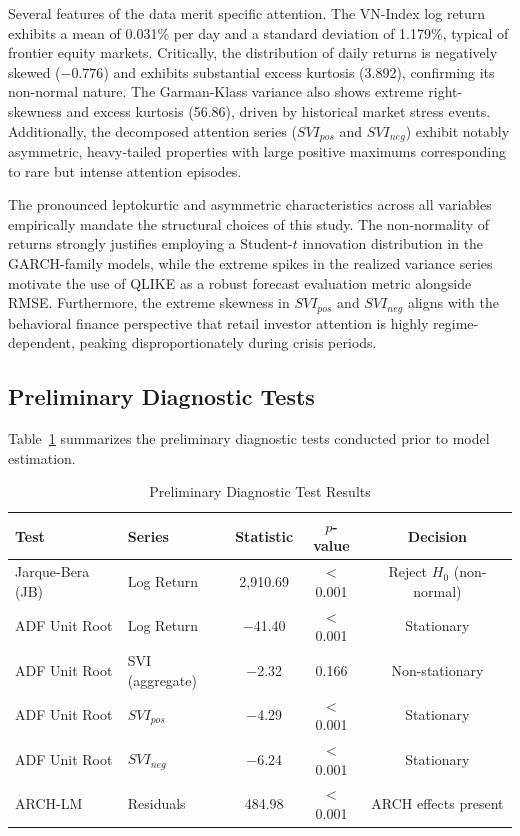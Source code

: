 \documentclass[12pt, a4paper]{article}
\begin{document}
Several features of the data merit specific attention. The VN-Index log return exhibits a mean of 0.031\% per day and a standard deviation of 1.179\%, typical of frontier equity markets. Critically, the distribution of daily returns is negatively skewed ($-0.776$) and exhibits substantial excess kurtosis (3.892), confirming its non-normal nature. The Garman-Klass variance also shows extreme right-skewness and excess kurtosis (56.86), driven by historical market stress events. Additionally, the decomposed attention series ($SVI_{pos}$ and $SVI_{neg}$) exhibit notably asymmetric, heavy-tailed properties with large positive maximums corresponding to rare but intense attention episodes.

The pronounced leptokurtic and asymmetric characteristics across all variables empirically mandate the structural choices of this study. The non-normality of returns strongly justifies employing a Student-$t$ innovation distribution in the GARCH-family models, while the extreme spikes in the realized variance series motivate the use of QLIKE as a robust forecast evaluation metric alongside RMSE. Furthermore, the extreme skewness in $SVI_{pos}$ and $SVI_{neg}$ aligns with the behavioral finance perspective that retail investor attention is highly regime-dependent, peaking disproportionately during crisis periods.

\subsection{Preliminary Diagnostic Tests}

Table~\ref{tab:diagnostics} summarizes the preliminary diagnostic tests conducted prior to model estimation.

\begin{table}[H]
\centering
\caption{Preliminary Diagnostic Test Results}
\label{tab:diagnostics}
\small
\begin{tabular}{llccc}
\toprule
Test & Series & Statistic & $p$-value & Decision \\
\midrule
Jarque-Bera (JB)  & Log Return       & 2,910.69 & $<$0.001 & Reject $H_0$ (non-normal) \\
ADF Unit Root     & Log Return       & $-$41.40 & $<$0.001 & Stationary \\
ADF Unit Root     & SVI (aggregate)  & $-$2.32  & 0.166    & Non-stationary \\
ADF Unit Root     & $SVI_{pos}$      & $-$4.29  & $<$0.001 & Stationary \\
ADF Unit Root     & $SVI_{neg}$      & $-$6.24  & $<$0.001 & Stationary \\
ARCH-LM           & Residuals        & 484.98   & $<$0.001 & ARCH effects present \\
\bottomrule
\end{tabular}
\end{table}
\end{document}
